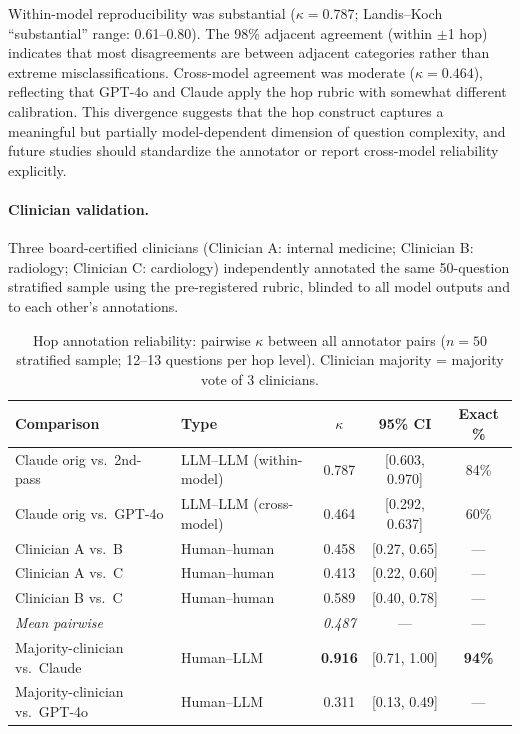 \documentclass{article}
\begin{document}
Within-model reproducibility was substantial ($\kappa = 0.787$; Landis--Koch
``substantial'' range: 0.61--0.80). The 98\% adjacent agreement (within $\pm$1
hop) indicates that most disagreements are between adjacent categories rather
than extreme misclassifications. Cross-model agreement was moderate
($\kappa = 0.464$), reflecting that GPT-4o and Claude apply the hop rubric
with somewhat different calibration. This divergence suggests that the hop
construct captures a meaningful but partially model-dependent dimension of
question complexity, and future studies should standardize the annotator or
report cross-model reliability explicitly.

\paragraph{Clinician validation.}
Three board-certified clinicians (Clinician A: internal medicine; Clinician B:
radiology; Clinician C: cardiology) independently annotated the same 50-question
stratified sample using the pre-registered rubric, blinded to all model outputs
and to each other's annotations.

\begin{table}[h]
\centering
\caption{Hop annotation reliability: pairwise $\kappa$ between all annotator pairs
($n = 50$ stratified sample; 12--13 questions per hop level).
Clinician majority = majority vote of 3 clinicians.}
\label{tab:hop_kappa_full}
\small
\begin{tabular}{llccc}
\toprule
\textbf{Comparison} & \textbf{Type} & \textbf{$\kappa$} & \textbf{95\% CI} & \textbf{Exact \%} \\
\midrule
Claude orig vs.\ 2nd-pass  & LLM–LLM (within-model) & 0.787 & [0.603, 0.970] & 84\% \\
Claude orig vs.\ GPT-4o    & LLM–LLM (cross-model)  & 0.464 & [0.292, 0.637] & 60\% \\
\midrule
Clinician A vs.\ B & Human–human & 0.458 & [0.27, 0.65] & --- \\
Clinician A vs.\ C & Human–human & 0.413 & [0.22, 0.60] & --- \\
Clinician B vs.\ C & Human–human & 0.589 & [0.40, 0.78] & --- \\
\textit{Mean pairwise} & & \textit{0.487} & --- & --- \\
\midrule
Majority-clinician vs.\ Claude & Human–LLM & \textbf{0.916} & [0.71, 1.00] & \textbf{94\%} \\
Majority-clinician vs.\ GPT-4o & Human–LLM & 0.311 & [0.13, 0.49] & --- \\
\bottomrule
\end{tabular}
\end{table}
\end{document}
